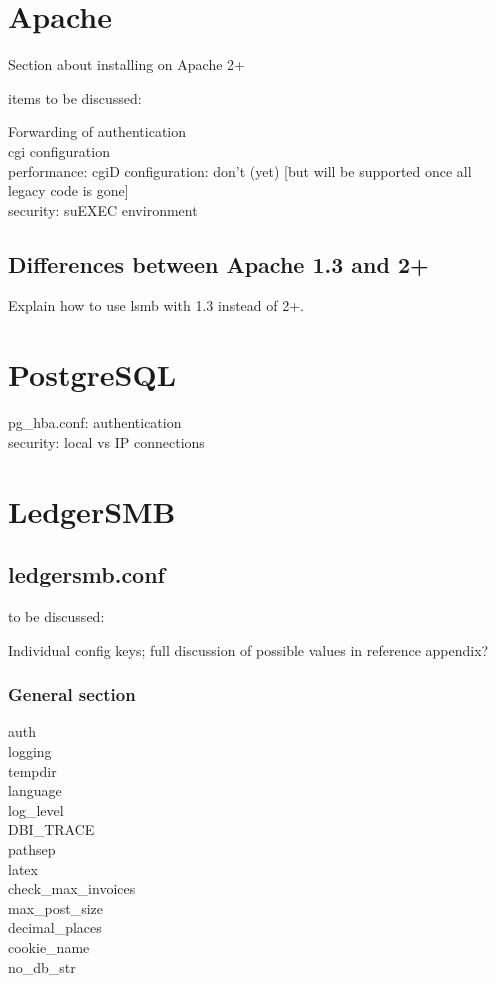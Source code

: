 \documentclass[10pt,A4]{book}
\begin{document}
\section{Apache}

Section about installing on Apache 2+

items to be discussed:

Forwarding of authentication \\
cgi configuration \\
performance: cgiD configuration: don't (yet) [but will be supported once all legacy code is gone] \\
security: suEXEC environment \\

\subsection{Differences between Apache 1.3 and 2+}

Explain how to use lsmb with 1.3 instead of 2+.

\section{PostgreSQL}

pg\_hba.conf: authentication \\
security: local vs IP connections \\




\section{LedgerSMB}

\subsection{ledgersmb.conf}

to be discussed:

Individual config keys; full discussion of possible values in reference appendix?

\subsubsection{General section}

\begin{description}
\item[auth]
\item[logging]
\item[tempdir]
\item[language]
\item[log\_level]
\item[DBI\_TRACE]
\item[pathsep]
\item[latex]
\item[check\_max\_invoices]
\item[max\_post\_size]
\item[decimal\_places]
\item[cookie\_name]
\item[no\_db\_str]

\end{description}
\end{document}
